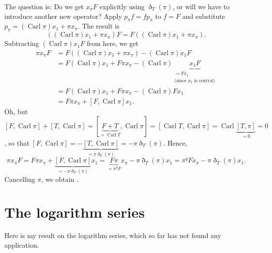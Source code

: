 \documentclass[numbers=enddot,12pt,final,onecolumn,notitlepage]{scrartcl}%
\theoremstyle{definition}
\begin{document}
The question is: Do we get $x_{\pi}F$ explicitly using $\eth_{T}\left(
\pi\right)  $, or will we have to introduce another new operator? Apply
$p_{\pi}f=fp_{\pi}$ to $f=F$ and substitute $p_{\pi}=\left(
\operatorname*{Carl}\pi\right)  x_{1}+\pi x_{\pi}$. The result is%
\[
\left(  \left(  \operatorname*{Carl}\pi\right)  x_{1}+\pi x_{\pi}\right)
F=F\left(  \left(  \operatorname*{Carl}\pi\right)  x_{1}+\pi x_{\pi}\right)
.
\]
Subtracting $\left(  \operatorname*{Carl}\pi\right)  x_{1}F$ from here, we get%
\begin{align*}
\pi x_{\pi}F  &  =F\left(  \left(  \operatorname*{Carl}\pi\right)  x_{1}+\pi
x_{\pi}\right)  -\left(  \operatorname*{Carl}\pi\right)  x_{1}F\\
&  =F\left(  \operatorname*{Carl}\pi\right)  x_{1}+F\pi x_{\pi}-\left(
\operatorname*{Carl}\pi\right)  \underbrace{x_{1}F}_{\substack{=Fx_{1}%
\\\text{(since }x_{1}\text{ is central)}}}\\
&  =F\left(  \operatorname*{Carl}\pi\right)  x_{1}+F\pi x_{\pi}-\left(
\operatorname*{Carl}\pi\right)  Fx_{1}\\
&  =F\pi x_{\pi}+\left[  F,\operatorname*{Carl}\pi\right]  x_{1}.
\end{align*}
Oh, but $\left[  F,\operatorname*{Carl}\pi\right]  +\left[
T,\operatorname*{Carl}\pi\right]  =\left[  \underbrace{F+T}%
_{=\operatorname*{Carl}T},\operatorname*{Carl}\pi\right]  =\left[
\operatorname*{Carl}T,\operatorname*{Carl}\pi\right]  =\operatorname*{Carl}%
\underbrace{\left[  T,\pi\right]  }_{=0}=0$, so that $\left[
F,\operatorname*{Carl}\pi\right]  =-\underbrace{\left[  T,\operatorname*{Carl}%
\pi\right]  }_{=\pi\eth_{T}\left(  \pi\right)  }=-\pi\eth_{T}\left(
\pi\right)  $. Hence,%
\[
\pi x_{\pi}F=F\pi x_{\pi}+\underbrace{\left[  F,\operatorname*{Carl}%
\pi\right]  }_{=-\pi\eth_{T}\left(  \pi\right)  }x_{1}=\underbrace{F\pi}%
_{=\pi^{q}F}x_{\pi}-\pi\eth_{T}\left(  \pi\right)  x_{1}=\pi^{q}Fx_{\pi}%
-\pi\eth_{T}\left(  \pi\right)  x_{1}.
\]
Cancelling $\pi$, we obtain .

\section{\label{sect.log}The logarithm series}

Here is my result on the logarithm series, which so far has not found any application.
\end{document}
